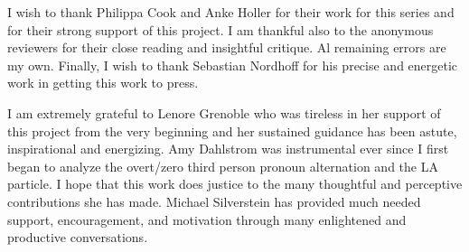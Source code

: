 \begin{refsection}

I wish to thank Philippa Cook and Anke Holler for their work for this series and for their strong support of this project. I am thankful also to the anonymous reviewers for their close reading and insightful critique. Al remaining errors are my own. Finally, I wish to thank Sebastian Nordhoff for his precise and energetic work in getting this work to press.

I am extremely grateful to Lenore Grenoble who was tireless in her support of this project from the very beginning and her sustained guidance has been astute, inspirational and energizing. Amy Dahlstrom was instrumental ever since I first began to analyze the overt/zero third person pronoun alternation and the LA particle. I hope that this work does justice to the many thoughtful and perceptive contributions she has made. Michael Silverstein has provided much needed support, encouragement, and motivation through many enlightened and productive conversations.



\end{refsection}
